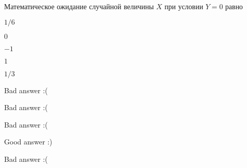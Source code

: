 
\begin{question}
Математическое ожидание случайной величины \(X\) при условии \(Y=0\)
равно
\begin{answerlist}
  \item \(1/6\)
  \item \(0\)
  \item \(-1\)
  \item \(1\)
  \item \(1/3\)
\end{answerlist}
\end{question}

\begin{solution}
\begin{answerlist}
  \item Bad answer :(
  \item Bad answer :(
  \item Bad answer :(
  \item Good answer :)
  \item Bad answer :(
\end{answerlist}
\end{solution}

